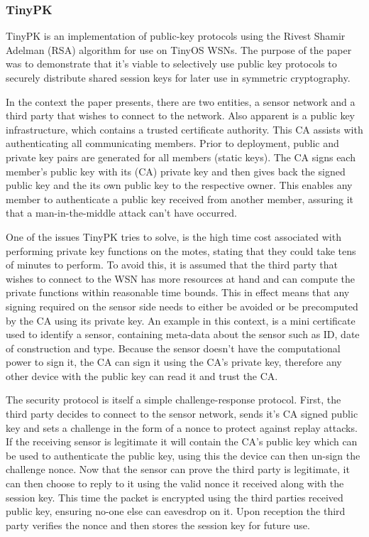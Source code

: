 \documentclass{mprop}
\begin{document}

\subsubsection{TinyPK} %
\label{ssub:tinypk}
TinyPK is an implementation of public-key protocols using the Rivest Shamir Adelman (RSA) algorithm for use on TinyOS WSNs\cite{TinyPK}. The purpose of the paper was to demonstrate that it's viable to selectively use public key protocols to securely distribute shared session keys for later use in symmetric cryptography.

In the context the paper presents, there are two entities, a sensor network and a third party that wishes to connect to the network. Also apparent is a public key infrastructure, which contains a trusted certificate authority. This CA assists with authenticating all communicating members. Prior to deployment, public and private key pairs are generated for all members (static keys). The CA signs each member's public key with its (CA) private key and then gives back the signed public key and the its own public key to the respective owner. This enables any member to authenticate a public key received from another member, assuring it that a man-in-the-middle attack can't have occurred.

One of the issues TinyPK tries to solve, is the high time cost associated with performing private key functions on the motes, stating that they could take tens of minutes to perform. To avoid this, it is assumed that the third party that wishes to connect to the WSN has more resources at hand and can compute the private functions within reasonable time bounds. This in effect means that any signing required on the sensor side needs to either be avoided or be precomputed by the CA using its private key. An example in this context, is a mini certificate used to identify a sensor, containing meta-data about the sensor such as ID, date of construction and type. Because the sensor doesn't have the computational power to sign it, the CA can sign it using the CA's private key, therefore any other device with the public key can read it and trust the CA.

The security protocol is itself a simple challenge-response protocol. First, the third party decides to connect to the sensor network, sends it's CA signed public key and sets a challenge in the form of a nonce to protect against replay attacks. If the receiving sensor is legitimate it will contain the CA's public key which can be used to authenticate the public key, using this the device can then un-sign the challenge nonce. Now that the sensor can prove the third party is legitimate, it can then choose to reply to it using the valid nonce it received along with the session key. This time the packet is encrypted using the third parties received public key, ensuring no-one else can eavesdrop on it. Upon reception the third party verifies the nonce and then stores the session key for future use. 
\end{document}

